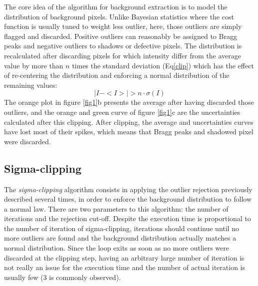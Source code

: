 \documentclass[preprint]{iucr}              %
\begin{document}
The core idea of the algorithm for background extraction is to model the distribution of background pixels. Unlike Bayesian statistics \cite{Sivia2006} where the cost function is usually tuned to weight less outlier, here, those outliers are simply flagged and discarded.
Positive outliers can reasonably be assigned to Bragg peaks and negative outliers to shadows or defective pixels. 
The distribution is recalculated  after discarding pixels for which intensity differ from the average value by more than $n$ times the standard deviation (Eq\ref{clip}) which has the effect of re-centering the distribution and enforcing a normal distribution of the remaining values:
\begin{equation}
\label{clip}
|I - <I>| > n \cdot \sigma(I)
\end{equation}
The orange plot in figure \ref{fig1}b presents the average after having discarded those outliers, and the orange and green curve of figure \ref{fig1}c are the uncertainties calculated after this clipping. 
After clipping, the average and uncertainties curves have lost most of their spikes, which means that Bragg peaks and shadowed pixel were discarded.
 
\subsection{Sigma-clipping}
The \textit{sigma-clipping} algorithm consists in applying the outlier rejection previously described several times, in order to enforce the background distribution to follow a normal law.
There are two parameters to this algorithm: the number of iterations and the rejection cut-off.
Despite the execution time is proportional to the number of iteration of sigma-clipping, iterations should continue until no more outliers are found and the 
background distribution actually matches a normal distribution. 
Since the loop exits as soon as no more outliers were discarded at the clipping step, having an arbitrary large number of iteration is not really an issue for the execution time and the number of actual iteration is usually few (3 is commonly observed).       
\end{document}
